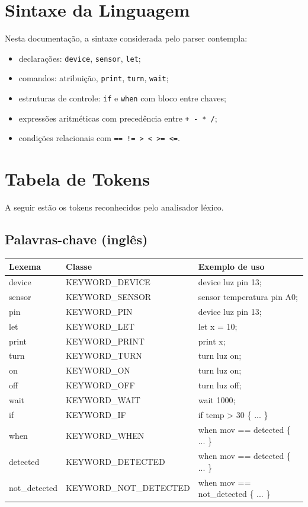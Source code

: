 \documentclass[12pt,a4paper]{article}
\begin{document}
\section{Sintaxe da Linguagem}
Nesta documentação, a sintaxe considerada pelo parser contempla:
\begin{itemize}
  \item declarações: \texttt{device}, \texttt{sensor}, \texttt{let};
  \item comandos: atribuição, \texttt{print}, \texttt{turn}, \texttt{wait};
  \item estruturas de controle: \texttt{if} e \texttt{when} com bloco entre chaves;
  \item expressões aritméticas com precedência entre \texttt{+ - * /};
  \item condições relacionais com \texttt{== != > < >= <=}.
\end{itemize}

\section{Tabela de Tokens}
A seguir estão os tokens reconhecidos pelo analisador léxico.

\subsection{Palavras-chave (inglês)}
\begin{longtable}{>{\raggedright\arraybackslash\ttfamily}p{2.8cm} >{\raggedright\arraybackslash\ttfamily}p{5.5cm} >{\raggedright\arraybackslash}p{4.9cm}}
\toprule
\textnormal{Lexema} & \textnormal{Classe} & \textnormal{Exemplo de uso} \\
\midrule
\endhead
device & KEYWORD\_DEVICE & device luz pin 13; \\
sensor & KEYWORD\_SENSOR & sensor temperatura pin A0; \\
pin & KEYWORD\_PIN & device luz pin 13; \\
let & KEYWORD\_LET & let x = 10; \\
print & KEYWORD\_PRINT & print x; \\
turn & KEYWORD\_TURN & turn luz on; \\
on & KEYWORD\_ON & turn luz on; \\
off & KEYWORD\_OFF & turn luz off; \\
wait & KEYWORD\_WAIT & wait 1000; \\
if & KEYWORD\_IF & if temp > 30 \{ ... \} \\
when & KEYWORD\_WHEN & when mov == detected \{ ... \} \\
detected & KEYWORD\_DETECTED & when mov == detected \{ ... \} \\
not\_detected & KEYWORD\_NOT\_DETECTED & when mov == not\_detected \{ ... \} \\
\bottomrule
\end{longtable}
\end{document}
